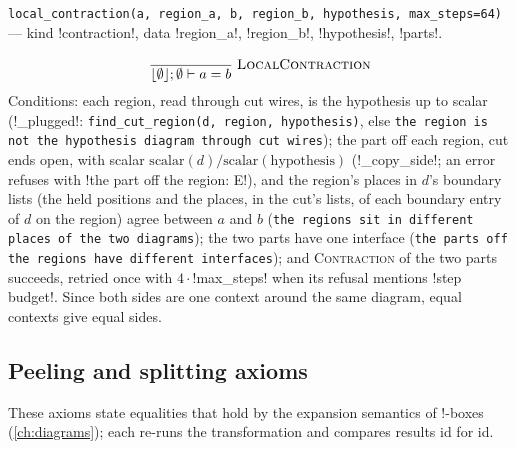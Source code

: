 \begin{signature}
\texttt{local\_\allowbreak{}contraction(\allowbreak{}a,\allowbreak{} region\_\allowbreak{}a,\allowbreak{} b,\allowbreak{} region\_\allowbreak{}b,\allowbreak{} hypothesis,\allowbreak{} max\_\allowbreak{}steps=64)} --- kind \code!contraction!, data \code!region_a!, \code!region_b!, \code!hypothesis!, \code!parts!.
\end{signature}
\[
\frac{}{\lfloor\emptyset\rfloor;\emptyset\vdash a=b}\;\textsc{LocalContraction}
\]
Conditions: each region, read through cut wires, is the hypothesis up to scalar (\py!_plugged!: \texttt{find\_\allowbreak{}cut\_\allowbreak{}region(\allowbreak{}d,\allowbreak{} region,\allowbreak{} hypothesis)}, else \texttt{the region is not the hypothesis diagram through cut wires}); the part off each region, cut ends open, with scalar $\text{scalar}(d)/\text{scalar}(\text{hypothesis})$ (\py!_copy_side!; an error refuses with \code!the part off the region: E!), and the region's places in $d$'s boundary lists (the held positions and the places, in the cut's lists, of each boundary entry of $d$ on the region) agree between $a$ and $b$ (\texttt{the regions sit in different places of the two diagrams}); the two parts have one interface (\texttt{the parts off the regions have different interfaces}); and \textsc{Contraction} of the two parts succeeds, retried once with $4\cdot$\code!max_steps! when its refusal mentions \code!step budget!. Since both sides are one context around the same diagram, equal contexts give equal sides.

\subsection{Peeling and splitting axioms}

These axioms state equalities that hold by the expansion semantics of !-boxes (\cref{ch:diagrams}); each re-runs the transformation and compares results id for id.

